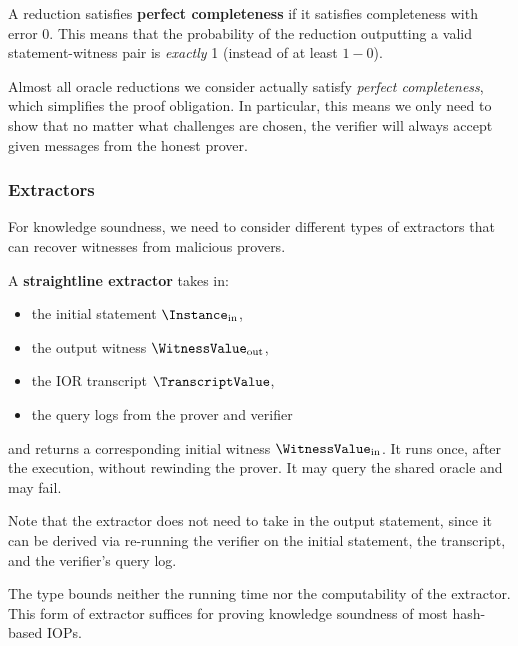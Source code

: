 \begin{definition}
    \label{def:perfect_completeness}
    A reduction satisfies \textbf{perfect completeness} if it satisfies completeness with error \(0\).
    This means that the probability of the reduction outputting a valid statement-witness pair is
    \emph{exactly} 1 (instead of at least \(1 - 0\)).
    \leanok
\end{definition}

Almost all oracle reductions we consider actually satisfy \emph{perfect completeness}, which
simplifies the proof obligation. In particular, this means we only need to show that no matter what challenges are chosen, the verifier will always accept given messages from the honest prover.

\subsubsection{Extractors}

For knowledge soundness, we need to consider different types of extractors that can recover witnesses from malicious provers.

\begin{definition}
    \label{def:straightline_extractor}
    A \textbf{straightline extractor} takes in:
    \begin{itemize}
        \item the initial statement \(\Instance_{\text{in}}\),
        \item the output witness \(\WitnessValue_{\text{out}}\),
        \item the IOR transcript \(\TranscriptValue\),
        \item the query logs from the prover and verifier
    \end{itemize}
    and returns a corresponding initial witness \(\WitnessValue_{\text{in}}\). It runs once, after the
    execution, without rewinding the prover. It may query the shared oracle and may fail.

    Note that the extractor does not need to take in the output statement, since it can be derived
    via re-running the verifier on the initial statement, the transcript, and the verifier's query
    log.

    The type bounds neither the running time nor the computability of the extractor. This form of
    extractor suffices for proving knowledge soundness of most hash-based IOPs.
    \leanok
\end{definition}

